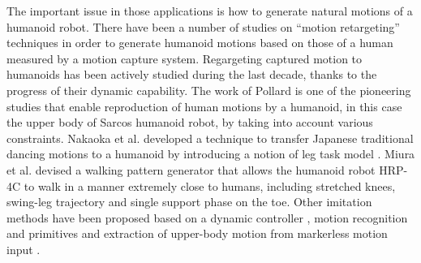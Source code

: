 \documentclass[letterpaper, 10 pt, conference]{ieeeconf}  %
\begin{document}
The important issue in those applications is how to generate natural
motions of a humanoid robot.  There have been a number of studies on
``motion retargeting'' techniques in order to generate humanoid
motions based on those of a human measured by a motion capture system.
Regargeting captured motion to humanoids has been actively studied
during the last decade, thanks to the progress of their dynamic
capability. The work of Pollard \cite{Pollard02ICRA} is one of the
pioneering studies that enable reproduction of human motions by a
humanoid, in this case the upper body of Sarcos humanoid robot, by
taking into account various constraints.  Nakaoka et al. developed a
technique to transfer Japanese traditional dancing motions to a
humanoid by introducing a notion of leg task model
\cite{nakaoka_icra2004,nakaoka_2007}.  Miura et al. \cite{Miura11IROS}
devised a walking pattern generator that allows the humanoid robot
HRP-4C to walk in a manner extremely close to humans, including
stretched knees, swing-leg trajectory and single support phase on the
toe.  Other imitation methods have been proposed based on a dynamic
controller \cite{Yamane11humanoids,Ramos11humanoids}, motion
recognition and primitives \cite{Ott08humanoids} and extraction of
upper-body motion from markerless motion input
\cite{Dariush08IROS,Do08humanoids}.
\end{document}

